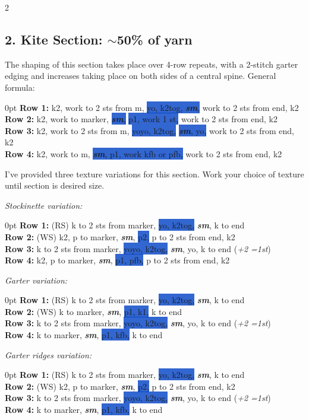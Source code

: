 \documentclass[12pt]{article}
\newcommand{\vocab}[1]{\emph{\textbf{#1}}} %
\newcommand{\rowDir}[1]{\textbf{#1:}} %
\newcommand{\increase}[1]{(\emph{+#1 
	\ifnum#1=1{st}\else{sts}\fi})}
\newcommand{\spine}[1]{\colorbox{highlight}{#1}}
\newcommand{\sm}{\vocab{sm}} %
\newenvironment{unframed}
    {%
	\begin{addmargin}[2em]{0pt}
	\small
	\setlength{\parindent}{-2em}}
    {\vspace{1em}
	\normalsize
	\end{addmargin}
	\setlength{\parindent}{0em}}
\begin{document}
\begin{multicols}{2}
\subsection*{2. Kite Section: $\sim$50\% of yarn}
The shaping of this section takes place over 4-row repeats, with a 2-stitch garter edging and increases taking place on both sides of a central spine. General formula:
\begin{unframed}
\rowDir{Row 1} k2, work to 2 sts from m, \spine{yo, k2tog, \sm,} work to 2 sts from end, k2\\
\rowDir{Row 2} k2, work to marker, \spine{\sm,} \spine{p1, work 1 st,} work to 2 sts from end, k2\\
\rowDir{Row 3} k2, work to 2 sts from m, \spine{yoyo, k2tog,} \spine{\sm, yo,} work to 2 sts from end, k2 \\
\rowDir{Row 4} k2, work to m, \spine{\sm, p1, work kfb or pfb,} work to 2 sts from end, k2
\end{unframed}

I've provided three texture variations for this section. Work your choice of texture until section is desired size.

\emph{Stockinette variation:}
\begin{unframed}
\rowDir{Row 1} (RS) k to 2 sts from marker, \spine{yo, k2tog,} \sm, k to end \\
\rowDir{Row 2} (WS) k2, p to marker, \sm, \spine{p2,} p to 2 sts from end, k2 \\
\rowDir{Row 3} k to 2 sts from marker, \spine{yoyo, k2tog,} \sm, yo, k to end \increase{2} \\
\rowDir{Row 4} k2, p to marker, \sm, \spine{p1, pfb,} p to 2 sts from end, k2
\end{unframed}

\emph{Garter variation:}
\begin{unframed}
\rowDir{Row 1} (RS) k to 2 sts from marker, \spine{yo, k2tog,} \sm, k to end \\
\rowDir{Row 2} (WS) k to marker, \sm, \spine{p1, k1,} k to end \\
\rowDir{Row 3} k to 2 sts from marker, \spine{yoyo, k2tog,} \sm, yo, k to end \increase{2} \\
\rowDir{Row 4} k to marker, \sm, \spine{p1, kfb,} k to end
\end{unframed}

\emph{Garter ridges variation:}
\begin{unframed}
\rowDir{Row 1} (RS) k to 2 sts from marker, \spine{yo, k2tog,} \sm, k to end \\
\rowDir{Row 2} (WS) k2, p to marker, \sm, \spine{p2,} p to 2 sts from end, k2 \\
\rowDir{Row 3} k to 2 sts from marker, \spine{yoyo, k2tog,} \sm, yo, k to end \increase{2} \\
\rowDir{Row 4} k to marker, \sm, \spine{p1, kfb,} k to end
\end{unframed}


\end{multicols}
\end{document}
